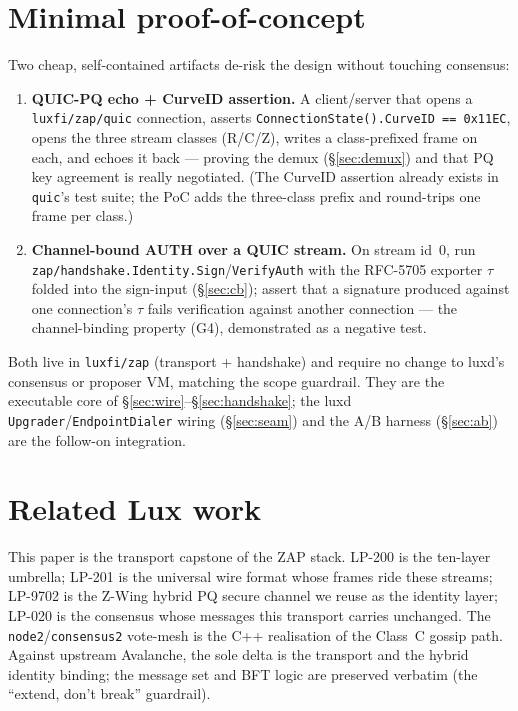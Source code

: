 \documentclass[11pt,a4paper]{article}
\newcommand{\code}[1]{\texttt{#1}}
\begin{document}
\section{Minimal proof-of-concept}\label{sec:poc}

Two cheap, self-contained artifacts de-risk the design without touching
consensus:

\begin{enumerate}[nosep]
  \item \textbf{QUIC-PQ echo + CurveID assertion.} A client/server that
        opens a \code{luxfi/zap/quic} connection, asserts
        \code{ConnectionState().CurveID == 0x11EC}, opens the three
        stream classes (R/C/Z), writes a class-prefixed frame on each,
        and echoes it back --- proving the demux (\S\ref{sec:demux}) and
        that PQ key agreement is really negotiated. (The CurveID
        assertion already exists in \code{quic}'s test suite; the PoC adds
        the three-class prefix and round-trips one frame per class.)
  \item \textbf{Channel-bound AUTH over a QUIC stream.} On stream id~0,
        run \code{zap/handshake.Identity.Sign}/\code{VerifyAuth} with the
        RFC-5705 exporter $\tau$ folded into the sign-input
        (\S\ref{sec:cb}); assert that a signature produced against one
        connection's $\tau$ fails verification against another
        connection --- the channel-binding property (G4), demonstrated as
        a negative test.
\end{enumerate}

Both live in \code{luxfi/zap} (transport + handshake) and require no
change to luxd's consensus or proposer VM, matching the scope guardrail.
They are the executable core of \S\ref{sec:wire}--\S\ref{sec:handshake};
the luxd \code{Upgrader}/\code{EndpointDialer} wiring (\S\ref{sec:seam})
and the A/B harness (\S\ref{sec:ab}) are the follow-on integration.

\section{Related Lux work}\label{sec:related}

This paper is the transport capstone of the ZAP stack. LP-200
\cite{lp200zapstack} is the ten-layer umbrella; LP-201
\cite{lp201universalwire} is the universal wire format whose frames ride
these streams; LP-9702 \cite{lp9702zwing} is the Z-Wing hybrid PQ secure
channel we reuse as the identity layer; LP-020 \cite{lp020quasar} is the
consensus whose messages this transport carries unchanged. The
\code{node2}/\code{consensus2} vote-mesh is the C++ realisation of the
Class~C gossip path. Against upstream Avalanche, the sole delta is the
transport and the hybrid identity binding; the message set and BFT logic
are preserved verbatim (the ``extend, don't break'' guardrail).
\end{document}
